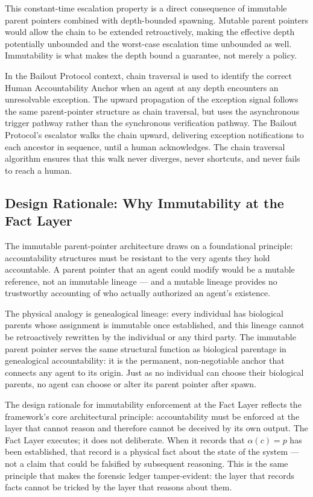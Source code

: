 This constant-time escalation property is a direct consequence of immutable parent pointers combined with depth-bounded spawning. Mutable parent pointers would allow the chain to be extended retroactively, making the effective depth potentially unbounded and the worst-case escalation time unbounded as well. Immutability is what makes the depth bound a guarantee, not merely a policy.

In the Bailout Protocol context, chain traversal is used to identify the correct Human Accountability Anchor when an agent at any depth encounters an unresolvable exception. The upward propagation of the exception signal follows the same parent-pointer structure as chain traversal, but uses the asynchronous trigger pathway rather than the synchronous verification pathway. The Bailout Protocol's escalator walks the chain upward, delivering exception notifications to each ancestor in sequence, until a human acknowledges. The chain traversal algorithm ensures that this walk never diverges, never shortcuts, and never fails to reach a human.

\subsection{Design Rationale: Why Immutability at the Fact Layer}
\label{sec:design-rationale}

The immutable parent-pointer architecture draws on a foundational principle: accountability structures must be resistant to the very agents they hold accountable. A parent pointer that an agent could modify would be a mutable reference, not an immutable lineage — and a mutable lineage provides no trustworthy accounting of who actually authorized an agent's existence.

The physical analogy is genealogical lineage: every individual has biological parents whose assignment is immutable once established, and this lineage cannot be retroactively rewritten by the individual or any third party. The immutable parent pointer serves the same structural function as biological parentage in genealogical accountability: it is the permanent, non-negotiable anchor that connects any agent to its origin. Just as no individual can choose their biological parents, no agent can choose or alter its parent pointer after spawn.

The design rationale for immutability enforcement at the Fact Layer reflects the framework's core architectural principle: accountability must be enforced at the layer that cannot reason and therefore cannot be deceived by its own output. The Fact Layer executes; it does not deliberate. When it records that $\alpha(c) = p$ has been established, that record is a physical fact about the state of the system — not a claim that could be falsified by subsequent reasoning. This is the same principle that makes the forensic ledger tamper-evident: the layer that records facts cannot be tricked by the layer that reasons about them.

